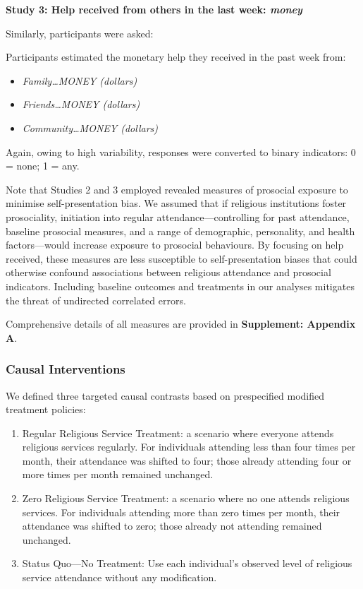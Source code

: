 \documentclass[
  single column]{article}
\providecommand{\tightlist}{%
  \setlength{\itemsep}{0pt}\setlength{\parskip}{0pt}}\usepackage{longtable,booktabs,array}
\begin{document}
\textbf{Study 3: Help received from others in the last week:
\emph{money} }

Similarly, participants were asked:

Participants estimated the monetary help they received in the past week
from:

\begin{itemize}
\tightlist
\item
  \emph{Family\ldots MONEY (dollars)}
\item
  \emph{Friends\ldots MONEY (dollars)}
\item
  \emph{Community\ldots MONEY (dollars)}
\end{itemize}

Again, owing to high variability, responses were converted to binary
indicators: 0 = none; 1 = any.

Note that Studies 2 and 3 employed revealed measures of prosocial
exposure to minimise self-presentation bias. We assumed that if
religious institutions foster prosociality, initiation into regular
attendance---controlling for past attendance, baseline prosocial
measures, and a range of demographic, personality, and health
factors---would increase exposure to prosocial behaviours. By focusing
on help received, these measures are less susceptible to
self-presentation biases that could otherwise confound associations
between religious attendance and prosocial indicators. Including
baseline outcomes and treatments in our analyses mitigates the threat of
undirected correlated errors.

Comprehensive details of all measures are provided in
\textbf{Supplement: Appendix A}.

\subsubsection{Causal Interventions}\label{causal-interventions}

We defined three targeted causal contrasts based on prespecified
modified treatment policies:

\begin{enumerate}
\def\labelenumi{\arabic{enumi}.}
\tightlist
\item
  Regular Religious Service Treatment: a scenario where everyone attends
  religious services regularly. For individuals attending less than four
  times per month, their attendance was shifted to four; those already
  attending four or more times per month remained unchanged.
\item
  Zero Religious Service Treatment: a scenario where no one attends
  religious services. For individuals attending more than zero times per
  month, their attendance was shifted to zero; those already not
  attending remained unchanged.
\item
  Status Quo---No Treatment: Use each individual's observed level of
  religious service attendance without any modification.
\end{enumerate}
\end{document}
